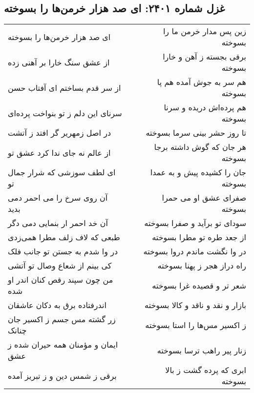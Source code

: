 \begin{center}
\section*{غزل شماره ۲۴۰۱: ای صد هزار خرمن‌ها را بسوخته}
\label{sec:2401}
\begin{longtable}{l p{0.5cm} r}
ای صد هزار خرمن‌ها را بسوخته
&&
زین پس مدار خرمن ما را بسوخته
\\
از عشق سنگ خارا بر آهنی زده
&&
برقی بجسته ز آهن و خارا بسوخته
\\
از سر قدم بساختم ای آفتاب حسن
&&
هم سر به جوش آمده هم پا بسوخته
\\
سرنای این دلم ز تو بنواخت پرده‌ای
&&
هم پرده‌اش دریده و سرنا بسوخته
\\
در اصل زمهریر گر افتد ز آتشت
&&
تا روز حشر بینی سرما بسوخته
\\
از عالم نه جای ندا کرد عشق تو
&&
هر جان که گوش داشته برجا بسوخته
\\
ای لطف سوزشی که شرار جمال تو
&&
جان را کشیده پیش و به عمدا بسوخته
\\
آن روی سرخ را می احمر دمی بدید
&&
صفرای عشق او می حمرا بسوخته
\\
آن خد احمر ار بنمایی دمی دگر
&&
سودای تو برآید و صفرا بسوخته
\\
طبعی که لاف زلف مطرا همی‌زدی
&&
از جعد طره تو مطرا بسوخته
\\
در وا شدم به جستن تو جانب فلک
&&
در وا نگشت ماندم دروا بسوخته
\\
کی بینم از شعاع وصال تو آتشی
&&
راه دراز هجر ز پهنا بسوخته
\\
من چون سپند رقص کنان اندر او شده
&&
شعر تر و قصیده غرا بسوخته
\\
اندرفتاده برق به دکان عاشقان
&&
بازار و نقد و ناقد و کالا بسوخته
\\
زر گشته مس جسم ز اکسیر جان چنانک
&&
ز اکسیر مس‌ها را استا بسوخته
\\
ایمان و مؤمنان همه حیران شده ز عشق
&&
زنار پیر راهب ترسا بسوخته
\\
برقی ز شمس دین و ز تبریز آمده
&&
ابری که پرده گشت ز بالا بسوخته
\\
\end{longtable}
\end{center}
